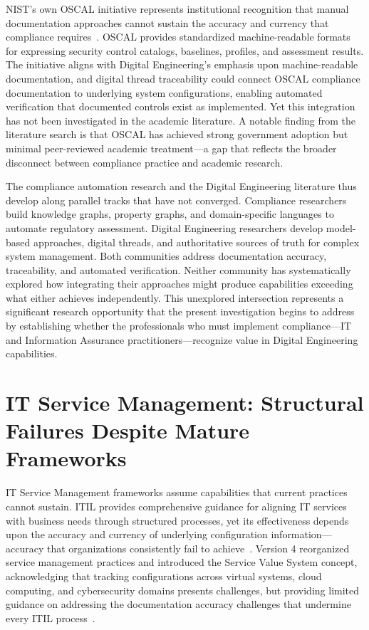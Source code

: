 NIST's own OSCAL initiative represents institutional recognition that manual documentation approaches cannot sustain the accuracy and currency that compliance requires~\parencite{NIST_OSCAL_2023}. OSCAL provides standardized machine-readable formats for expressing security control catalogs, baselines, profiles, and assessment results. The initiative aligns with Digital Engineering's emphasis upon machine-readable documentation, and digital thread traceability could connect OSCAL compliance documentation to underlying system configurations, enabling automated verification that documented controls exist as implemented. Yet this integration has not been investigated in the academic literature. A notable finding from the literature search is that OSCAL has achieved strong government adoption but minimal peer-reviewed academic treatment---a gap that reflects the broader disconnect between compliance practice and academic research.

The compliance automation research and the Digital Engineering literature thus develop along parallel tracks that have not converged. Compliance researchers build knowledge graphs, property graphs, and domain-specific languages to automate regulatory assessment. Digital Engineering researchers develop model-based approaches, digital threads, and authoritative sources of truth for complex system management. Both communities address documentation accuracy, traceability, and automated verification. Neither community has systematically explored how integrating their approaches might produce capabilities exceeding what either achieves independently. This unexplored intersection represents a significant research opportunity that the present investigation begins to address by establishing whether the professionals who must implement compliance---IT and Information Assurance practitioners---recognize value in Digital Engineering capabilities.

\section{IT Service Management: Structural Failures Despite Mature Frameworks}

IT Service Management frameworks assume capabilities that current practices cannot sustain. ITIL provides comprehensive guidance for aligning IT services with business needs through structured processes, yet its effectiveness depends upon the accuracy and currency of underlying configuration information---accuracy that organizations consistently fail to achieve~\parencite{Cannon_AXELOS_2013}. Version 4 reorganized service management practices and introduced the Service Value System concept, acknowledging that tracking configurations across virtual systems, cloud computing, and cybersecurity domains presents challenges, but providing limited guidance on addressing the documentation accuracy challenges that undermine every ITIL process~\parencite{ITIL_4_2019}.

